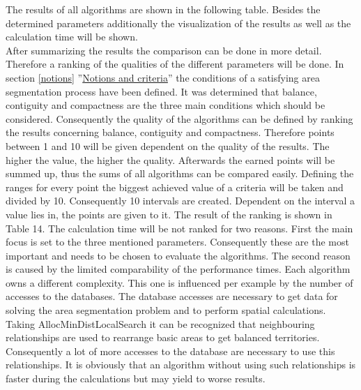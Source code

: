  The results of all algorithms are shown in the following table. Besides the determined parameters additionally the visualization of the results as well as the calculation time will be shown. \newline
 \\ After summarizing the results the comparison can be done in more detail. Therefore a ranking of the qualities of the different parameters will be done. In section \ref{notions} ''\hyperref[notions]{Notions and criteria}'' the conditions of a satisfying area segmentation process have been defined. It was determined that balance, contiguity and compactness are the three main conditions which should be considered. Consequently the quality of the algorithms can be defined by ranking the results concerning balance, contiguity and compactness. Therefore points between 1 and 10 will be given dependent on the quality of the results. The higher the value, the higher the quality. Afterwards the earned points will be summed up, thus the sums of all algorithms can be compared easily. Defining the ranges for every point the biggest achieved value of a criteria will be taken and divided by 10. Consequently 10 intervals are created. Dependent on the interval a value lies in, the points are given to it. The result of the ranking is shown in Table 14. The calculation time will be not ranked for two reasons. First the main focus is set to the three mentioned parameters. Consequently these are the most important and needs to be chosen to evaluate the algorithms. The second reason is caused by the limited comparability of the performance times. Each algorithm owns a different complexity. This one is influenced per example by the number of accesses to the databases. The database accesses are necessary to get data for solving the area segmentation problem and to perform spatial calculations. Taking AllocMinDistLocalSearch it can be recognized that neighbouring relationships are used to rearrange basic areas to get balanced territories. Consequently a lot of more accesses to the database are necessary to use this relationships. It is obviously that an algorithm without using such relationships is faster during the calculations but may yield to worse results. 
 


